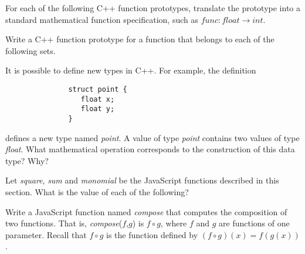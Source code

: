 \begin{exercises}

\problem For each of the following C++ function prototypes, translate the
prototype into a standard mathematical function specification, such
as $\textit{func}\colon\textit{float}\to\textit{int}$.

\problem Write a C++ function prototype for a function that
belongs to each of the following sets.

\smallskip


\problem It is possible to define new types in C++.  For example, the
definition
\begin{verbatim}
               struct point {
                  float x;
                  float y;
               }
\end{verbatim}
defines a new type named \textit{point}.  A value of type \textit{point}
contains two values of type \textit{float}.  What mathematical operation
corresponds to the construction of this data type?  Why?

\problem Let \textit{square}, \textit{sum} and \textit{monomial}
be the JavaScript functions described in this section.  What is the
value of each of the following?


\problem Write a JavaScript function named \textit{compose}
that computes the composition of two functions.  That
is, \textit{compose}($f$,$g$) is $f\circ g$, where
$f$ and $g$ are functions of one parameter.  Recall that
$f\circ g$ is the function defined by $(f\circ g)(x)=f(g(x))$.

\end{exercises}






